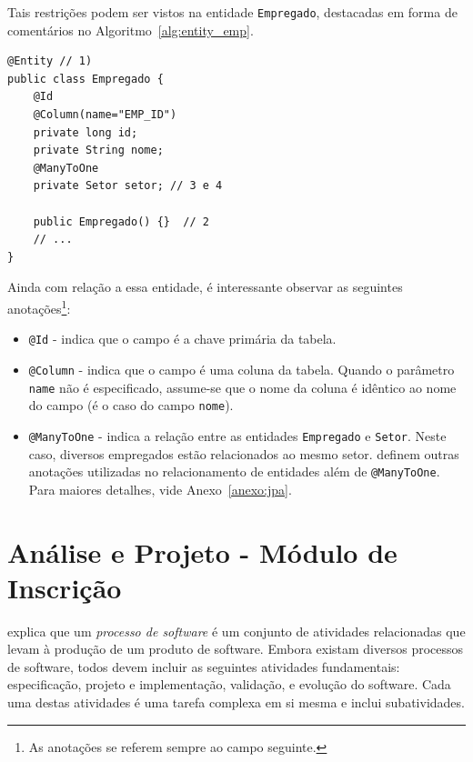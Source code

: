 \documentclass[
  10.5pt,				  %
	openright,			%
	twoside,			  %
  a5paper,
  chapter=TITLE,	%
	section=TITLE,	%
  hyphens,        %
	english,        %
	brazil          %
]{abntex2}
\begin{document}
Tais restrições podem ser vistos na entidade \texttt{Empregado}, destacadas em forma de comentários no Algoritmo~\ref{alg:entity_emp}.

\begin{lstlisting}[caption={Entidade Empregado e seus mapeamentos.}, label={alg:entity_emp}]
@Entity // 1)
public class Empregado {
    @Id
    @Column(name="EMP_ID")
    private long id;
    private String nome;
    @ManyToOne
    private Setor setor; // 3 e 4
    
    public Empregado() {}  // 2
    // ...
}
\end{lstlisting}
%
Ainda com relação a essa entidade, é interessante observar as seguintes anotações\footnote{As anotações se referem sempre ao campo seguinte.}:

\begin{itemize}
  \item \texttt{@Id} - indica que o campo é a chave primária da tabela.
  \item \texttt{@Column} - indica que o campo é uma coluna da tabela. Quando o parâmetro \texttt{name} não é especificado, assume-se que o nome da coluna é idêntico ao nome do campo (é o caso do campo \texttt{nome}).
  \item \texttt{@ManyToOne} - indica a relação entre as entidades \texttt{Empregado} e \texttt{Setor}. Neste caso, diversos empregados estão relacionados ao mesmo setor.  definem outras anotações utilizadas no relacionamento de entidades além de \texttt{@ManyToOne}. Para maiores detalhes, vide Anexo~\ref{anexo:jpa}.
\end{itemize}







\chapter{Análise e Projeto - Módulo de Inscrição}

 explica que um \emph{processo de software} é um conjunto de atividades relacionadas que levam à produção de um produto de software. Embora existam diversos processos de software, todos devem incluir as seguintes atividades fundamentais: especificação, projeto e implementação, validação, e evolução do software. Cada uma destas atividades é uma tarefa complexa em si mesma e inclui subatividades.
\end{document}
